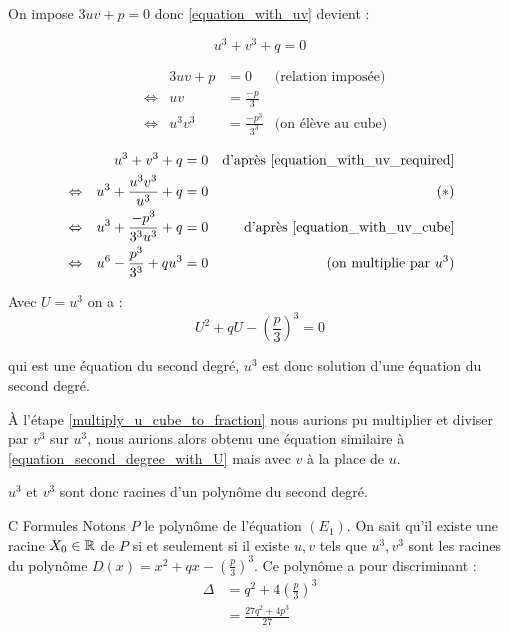 \documentclass[]{../templates/homework}
\begin{document}
\question On impose $3uv + p = 0$ donc \eqref{equation_with_uv} devient :

\begin{equation*}
	u^3 + v^3 + q = 0 \tag{$E_3$} \label{equation_with_uv_required}
\end{equation*}

\question

\begin{align*}
	 &                 & 3uv + p & = 0                & \text{(relation imposée)}                                           \\
	 & \Leftrightarrow & uv      & = \frac{-p}{3}     &                                                                     \\
	 & \Leftrightarrow & u^3v^3  & = \frac{-p^3}{3^3} & \text{(on élève au cube)} \tag{$E_4$} \label{equation_with_uv_cube}
\end{align*}

\question

\begin{align*}
	 &                 & u^3 + v^3 + q                 & = 0 & \text{d'après \eqref{equation_with_uv_required}} \\
	 & \Leftrightarrow & u^3 + \frac{u^3v^3}{u^3} + q  & = 0 & \tag{$\ast$} \label{multiply_u_cube_to_fraction} \\
	 & \Leftrightarrow & u^3 + \frac{-p^3}{3^3u^3} + q & = 0 & \text{d'après \eqref{equation_with_uv_cube}}     \\
	 & \Leftrightarrow & u^6 - \frac{p^3}{3^3} + qu^3  & = 0 & \text{(on multiplie par $u^3$)}
\end{align*}

Avec $U = u^3$ on a :
\begin{equation}
	\tag{$E_5$}
	U^2 + qU - \left(\frac{p}{3}\right)^3 = 0
	\label{equation_second_degree_with_U}
\end{equation}

qui est une équation du second degré, $u^3$ est donc solution d'une équation du second degré.

À l'étape \eqref{multiply_u_cube_to_fraction} nous aurions pu multiplier et diviser par $v^3$ sur $u^3$, nous aurions alors obtenu une équation similaire à \eqref{equation_second_degree_with_U} mais avec $v$ à la place de $u$.

$u^3$ et $v^3$ sont donc racines d'un polynôme du second degré.

\partie C {Formules}
\subproblem Notons $P$ le polynôme de l'équation $(E_1)$. On sait qu'il existe une racine $X_0 \in \mathbb R$ de $P$ si et seulement si il existe $u,v$ tels que $u^3,v^3$ sont les racines du polynôme $D(x) = x^2 + qx - \left(\frac p 3\right)^3$.
Ce polynôme a pour discriminant :
\begin{align*}
	\Delta &= q^2 + 4\left(\frac p 3\right)^3 \\
	&=  \frac {27q^2 + 4p^3}{27}
\end{align*}
\end{document}
